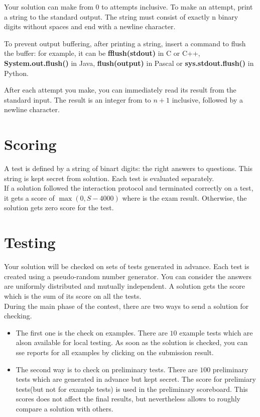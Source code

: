 \documentclass[hyperref,UTF8]{ctexart}
\theoremstyle{definition}
\theoremstyle{remark}
\numberwithin{equation}{subsection}
\newcommand{\Emph}{\textbf}
\begin{document}
	Your solution can make from $0$ to  attempts inclusive.
	To make an attempt, print a string to the standard output.
	The string must consist of exactly n binary digits without spaces and end with a newline character.
	
	To prevent output buffering, after printing a string, insert a command to flush the buffer:
	for example, it can be \Emph{fflush(stdout)} in C or C++, \Emph{System.out.flush()} in Java, \Emph{flush(output)} in Pascal or \Emph{sys.stdout.flush()} in Python.
	
	After each attempt you make, you can immediately read its result from the standard input.
	The result is an integer from  to $n+1$ inclusive, followed by a newline character.
	
\section{Scoring}	

	A test is defined by a string of  binart digits: the right answers to  questions.
	This string is kept secret from solution. Each test is evaluated separately.	\\
	
	If a solution followed the interaction protocol and terminated correctly on a test,
	it gets a score of $\max (0, S-4000)$ where  is the exam result.
	Otherwise, the solution gets zero score for the test.
	
\section{Testing}
	
	Your solution will be checked on sets of tests generated in advance.
	Each test is created using a pseudo-random number generator.
	You can consider the answers are uniformly distributed and mutually independent.
	A solution gets the score which is the sum of its score on all the tests.	\\
	
	During the main phase of the contest, there are two ways to send a solution for checking.
	\begin{itemize}
		
		\item The first one is the check on examples. There are $10$ example tests which are alson
		available for local testing. As soon as the solution is checked, you can sse reports for all
		examples by clicking on the submission result.
		
		\item The second way is to check on preliminary tests. There are $100$ preliminary tests which
		are generated in advance but kept secret. The score for prelimiary tests(but not for example tests)
		is used in the preliminary scoreboard. This scores does not affect the final results, but
		nevertheless allows to roughly compare a solution with others.
		
	\end{itemize}
	
\end{document}
